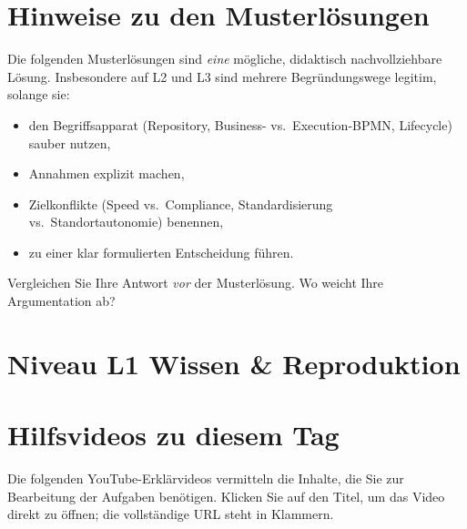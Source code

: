 \documentclass[11pt,a4paper,oneside]{article}
\begin{document}
\section*{Hinweise zu den Musterl\"osungen}
\thispagestyle{plain}

\noindent Die folgenden Musterl\"osungen sind \emph{eine} m\"ogliche, didaktisch nachvollziehbare L\"osung. Insbesondere auf L2 und L3 sind mehrere Begr\"undungswege legitim, solange sie:

\begin{itemize}
  \item den Begriffsapparat (Repository, Business- vs.\ Execution-BPMN, Lifecycle) sauber nutzen,
  \item Annahmen explizit machen,
  \item Zielkonflikte (Speed vs.\ Compliance, Standardisierung vs.\ Standortautonomie) benennen,
  \item zu einer klar formulierten Entscheidung f\"uhren.
\end{itemize}

\begin{infobox}
Vergleichen Sie Ihre Antwort \emph{vor} der Musterl\"osung. Wo weicht Ihre Argumentation ab?
\end{infobox}

\clearpage

\section*{Niveau L1 \textendash{} Wissen \& Reproduktion}

\section*{Hilfsvideos zu diesem Tag}
\thispagestyle{plain}

\noindent Die folgenden YouTube-Erkl\"arvideos vermitteln die Inhalte, die Sie zur Bearbeitung der Aufgaben ben\"otigen. Klicken Sie auf den Titel, um das Video direkt zu \"offnen; die vollst\"andige URL steht in Klammern.
\end{document}
